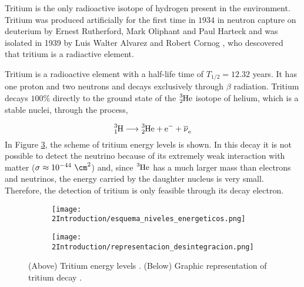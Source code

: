 Tritium is the only radioactive isotope of hydrogen present in the environment. Tritium was produced artificially for the first time in $1934$ in neutron capture on deuterium by Ernest Rutherford, Mark Oliphant and Paul Harteck \cite{TritiumDiscovery} and was isolated in 1939 by Luis Walter Alvarez and Robert Cornog \cite{TritiumIsolate}, who descovered that tritium is a radiactive element. 

Tritium is a radioactive element with a half-life time of $T_{1/2}= 12.32$ years. It has one proton and two neutrons and decays exclusively through $\beta$ radiation. Tritium decays $100\%$ directly to the ground state of the $\ce{^{3}_{2}He}$ isotope of helium, which is a stable nuclei, through the process,

\begin{equation}
\ce{^{3}_{1}H} \longrightarrow \ce{^{3}_{2}He}  + \ce{e^-}  + \ce{\overline{\nu}_e}
\label{eq:TritiumDecay}
\end{equation}
In Figure \ref{fig:TritiumDecay}, the scheme of tritium energy levels is shown. In this decay it is not possible to detect the neutrino because of its extremely weak interaction with matter ($\sigma \approx 10^{-44} ~ \cm^2$) \cite{CrossSeccionNeutrino} and, since $\ce{^{3}He}$ has a much larger mass than electrons and neutrinos, the energy carried by the daughter nucleus is very small. Therefore, the detection of tritium is only feasible through its decay electron. 

\begin{figure}
\centering
    \begin{subfigure}[b]{0.55\textwidth}
    \centering
    \texttt{[image: 2Introduction/esquema\_niveles\_energeticos.png]}  
    \caption{\label{subfig:Energy_levels}}
    \end{subfigure}
    \hfill
    \begin{subfigure}[b]{0.4\textwidth}
    \centering
    \texttt{[image: 2Introduction/representacion\_desintegracion.png]}  
    \caption{\label{subfig:GraphicDesintegration}}
    \end{subfigure}
 \caption{(Above) Tritium energy levels \cite{TritiumDecayEnergyLevels}. (Below) Graphic representation of tritium decay \cite{TritiumDecayImage}.}
 \label{fig:TritiumDecay}
\end{figure}

